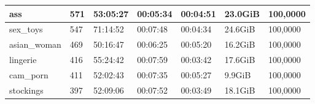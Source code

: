 \begin{table}[]
\begin{tabular}{l|l|l|l|l|l|l}
ass                                                & 571                                                 & 53:05:27                                                 & 00:05:34                                                & 00:04:51                                               & 23.0GiB                                              & 100,0000                                                      \\ \hline
sex\_toys                                          & 547                                                 & 71:14:52                                                 & 00:07:48                                                & 00:04:34                                               & 24.6GiB                                              & 100,0000                                                      \\ \hline
asian\_woman                                       & 469                                                 & 50:16:47                                                 & 00:06:25                                                & 00:05:20                                               & 16.2GiB                                              & 100,0000                                                      \\ \hline
lingerie                                           & 416                                                 & 55:24:42                                                 & 00:07:59                                                & 00:03:42                                               & 17.6GiB                                              & 100,0000                                                      \\ \hline
cam\_porn                                          & 411                                                 & 52:02:43                                                 & 00:07:35                                                & 00:05:27                                               & 9.9GiB                                               & 100,0000                                                      \\ \hline
stockings                                          & 397                                                 & 52:09:06                                                 & 00:07:52                                                & 00:03:49                                               & 18.1GiB                                              & 100,0000                                                      \\ \hline

\end{tabular}
\end{table}
